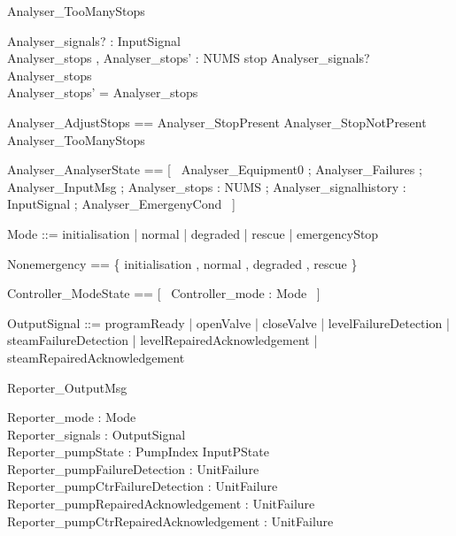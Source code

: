 \documentclass{article}
\begin{document}
\begin{schema}{Analyser\_TooManyStops}

 Analyser\_signals? : \power InputSignal \\
 Analyser\_stops , Analyser\_stops' : NUMS 
\where
 stop \notin Analyser\_signals? \land Analyser\_stops  \\
 Analyser\_stops' = Analyser\_stops
\end{schema}

\begin{zed}
	Analyser\_AdjustStops == Analyser\_StopPresent \lor Analyser\_StopNotPresent \lor Analyser\_TooManyStops
\end{zed}

\begin{zed}
	Analyser\_AnalyserState == [~  Analyser\_Equipment0 ; Analyser\_Failures ; Analyser\_InputMsg ; Analyser\_stops : NUMS ; Analyser\_signalhistory : \power InputSignal ; Analyser\_EmergenyCond  ~]
\end{zed}

\begin{zed}
	Mode ::= initialisation | normal | degraded | rescue | emergencyStop
\end{zed}

\begin{zed}
	Nonemergency == \{ initialisation , normal , degraded , rescue \}
\end{zed}

\begin{zed}
	Controller\_ModeState == [~  Controller\_mode : Mode  ~]
\end{zed}

\begin{zed}
	OutputSignal ::= programReady | openValve | closeValve | levelFailureDetection | steamFailureDetection | levelRepairedAcknowledgement | steamRepairedAcknowledgement
\end{zed}

\begin{schema}{Reporter\_OutputMsg}

 Reporter\_mode : Mode \\
 Reporter\_signals : \power OutputSignal \\
 Reporter\_pumpState : PumpIndex \fun InputPState \\
 Reporter\_pumpFailureDetection : \power UnitFailure \\
 Reporter\_pumpCtrFailureDetection : \power UnitFailure \\
 Reporter\_pumpRepairedAcknowledgement : \power UnitFailure \\
 Reporter\_pumpCtrRepairedAcknowledgement : \power UnitFailure
\end{schema}
\end{document}
